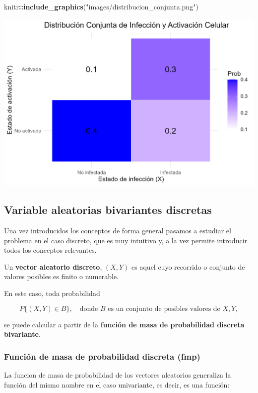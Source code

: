 \documentclass[
]{article}
\newenvironment{Shaded}{\begin{snugshade}}{\end{snugshade}}
\newcommand{\FunctionTok}[1]{\textcolor[rgb]{0.13,0.29,0.53}{\textbf{#1}}}
\newcommand{\NormalTok}[1]{#1}
\newcommand{\SpecialCharTok}[1]{\textcolor[rgb]{0.81,0.36,0.00}{\textbf{#1}}}
\newcommand{\StringTok}[1]{\textcolor[rgb]{0.31,0.60,0.02}{#1}}
\begin{document}
\begin{Shaded}
\begin{Highlighting}[]
\NormalTok{knitr}\SpecialCharTok{::}\FunctionTok{include\_graphics}\NormalTok{(}\StringTok{"images/distribucion\_conjunta.png"}\NormalTok{)}
\end{Highlighting}
\end{Shaded}

\includegraphics[width=0.8\linewidth]{images/distribucion_conjunta}

\subsection{Variable aleatorias bivariantes discretas}\label{variable-aleatorias-bivariantes-discretas}

Una vez introducidos los conceptos de forma general pasamos a estudiar el problema en el caso discreto, que es muy intuitivo y, a la vez permite introducir todos los conceptos relevantes.

Un \textbf{vector aleatorio discreto}, \((X, Y)\) es aquel cuyo recorrido o conjunto de valores posibles es finito o numerable.

En este caso, toda probabilidad

\[
P\{(X, Y) \in B\}, \quad \text{donde } B \text{ es un conjunto de posibles valores de } X, Y,
\]

se puede calcular a partir de la \textbf{función de masa de probabilidad discreta bivariante}.

\subsubsection{Función de masa de probabilidad discreta (fmp)}\label{funciuxf3n-de-masa-de-probabilidad-discreta-fmp}

La funcion de masa de probabilidad de los vectores aleatorios generaliza la función del mismo nombre en el caso univariante, es decir, es una función:
\end{document}

